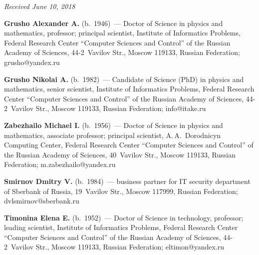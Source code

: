 \vspace*{-6pt}

\hfill{\small\textit{Received June 10, 2018}}



\Contr

\noindent
\textbf{Grusho Alexander A.} (b.\ 1946)~--- Doctor of Science in physics and 
mathematics, professor; principal scientist, Institute of Informatics Problems, Federal 
Research Center ``Computer Sciences and Control'' of the Russian Academy of 
Sciences, 44-2~Vavilov Str., Moscow 119133, Russian Federation; 
\mbox{grusho@yandex.ru}

\vspace*{3pt}

\noindent
\textbf{Grusho Nikolai A.} (b.\ 1982)~--- Candidate of Science (PhD) in physics and 
mathematics, senior scientist, Institute of Informatics Problems, Federal Research 
Center ``Computer Sciences and Control'' of the Russian Academy of Sciences, 
44-2~Vavilov Str., Moscow 119133, Russian Federation; \mbox{info@itake.ru}

\vspace*{3pt}

\noindent
\textbf{Zabezhailo Michael I.} (b.\ 1956)~--- Doctor of Science in physics and 
mathematics, associate professor; principal scientist, A.\,A.~Dorodnicyn Computing 
Center, Federal Research Center ``Computer Sciences and Control'' of the Russian 
Academy of Sciences, 40~Vavilov Str., Moscow 119133, Russian Federation; 
\mbox{m.zabezhailo@yandex.ru}

\vspace*{3pt}

\noindent
\textbf{Smirnov Dmitry V.} (b.\ 1984)~--- business partner for IT security 
department of Sberbank of Russia, 19~Vavilov Str., Moscow 117999, Russian 
Federation; \mbox{dvlsmirnov@sberbank.ru}

\vspace*{3pt}

\noindent
\textbf{Timonina Elena E.} (b.\ 1952)~--- Doctor of Science in technology, 
professor; leading scientist, Institute of Informatics Problems, Federal Research 
Center ``Computer Sciences and Control'' of the Russian Academy of Sciences,  
44-2~Vavilov Str., Moscow 119133, Russian Federation; 
\mbox{eltimon@yandex.ru}

 

\label{end\stat}


\renewcommand{\bibname}{\protect\rm Литература} 
